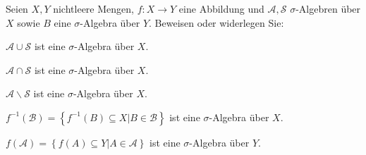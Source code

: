 \begin{Problem}
	 Seien $X, Y$ nichtleere Mengen, $f : X \to Y$ eine Abbildung und $\mathcal A, \mathcal S$ $\sigma$-Algebren über $X$ sowie $B$ eine $\sigma$-Algebra über $Y$. Beweisen oder widerlegen Sie:
	 \begin{parts}
		 \item $\mathcal A \cup \mathcal S$ ist eine $\sigma$-Algebra \"{u}ber $X$.
		 \item $\mathcal A \cap \mathcal S$ ist eine $\sigma$-Algebra \"{u}ber $X$. 
		 \item $\mathcal A \backslash \mathcal S$ ist eine $\sigma$-Algebra \"{u}ber $X$.
		 \item $f ^{-1}(\mathcal B)=\left\{ f^{-1}(B)\subseteq X | B\in\mathcal B \right\}$ ist eine $\sigma$-Algebra \"{u}ber $X$.
		 \item $f(\mathcal A)=\left\{ f(A)\subseteq Y|A\in \mathcal A \right\} $ ist eine $\sigma$-Algebra \"{u}ber $Y$.
	 \end{parts}
\end{Problem}
